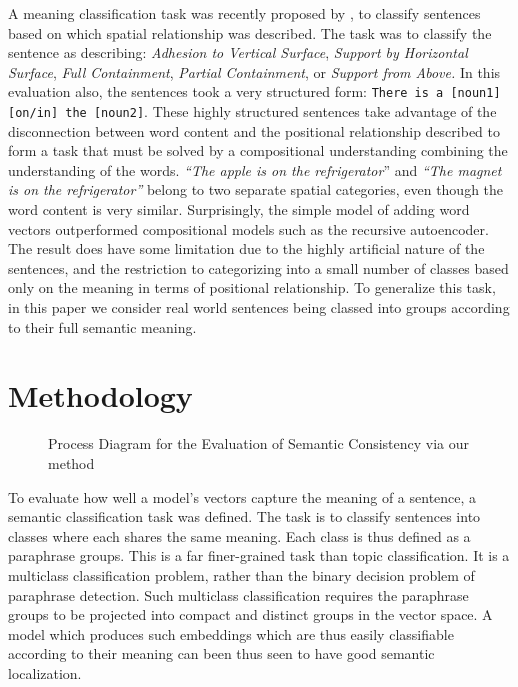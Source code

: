 \documentclass[]{book}
\begin{document}
A meaning classification task was recently proposed by \citet{RitterPosition}, to classify sentences based on which spatial
relationship was described. The task was to classify the sentence
as describing: \emph{Adhesion to Vertical Surface},\emph{ Support
by Horizontal Surface},\emph{ Full Containment},\emph{ Partial Containment},\emph{
}or\emph{ Support from Above.} In this evaluation also, the sentences
took a very structured form: \texttt{There is a {[}noun1{]} {[}on/in{]}
the {[}noun2{]}}. These highly structured sentences take advantage
of the disconnection between word content and the positional relationship
described to form a task that must be solved by a compositional understanding
combining the understanding of the words. \emph{``The apple is on
the refrigerator}'' and \emph{``The magnet is on the refrigerator''}
belong to two separate spatial categories, even though the word content
is very similar. Surprisingly, the simple model of adding word vectors
outperformed compositional models such as the recursive autoencoder.
The result does have some limitation due to the highly artificial
nature of the sentences, and the restriction to categorizing into
a small number of classes based only on the meaning in terms of positional
relationship. To generalize this task, in this paper we consider real
world sentences being classed into groups according to their full
semantic meaning.


\section{Methodology}

\label{sec:Methodology}

\begin{figure}
\resizebox{\textwidth}{!}{}

\caption{\label{fig:Process-Diagram} Process Diagram for the Evaluation of Semantic Consistency via our method}
\end{figure}


To evaluate how well a model's vectors capture the meaning of a sentence,
a semantic classification task was defined. The task is to classify
sentences into classes where each shares the same meaning. Each class
is thus defined as a paraphrase groups. This is a far finer-grained
task than topic classification. It is a multiclass classification
problem, rather than the binary decision problem of paraphrase detection.
Such multiclass classification requires the paraphrase groups to be
projected into compact and distinct groups in the vector space. A
model which produces such embeddings which are thus easily classifiable
according to their meaning can been thus seen to have good semantic
localization. 
\end{document}
